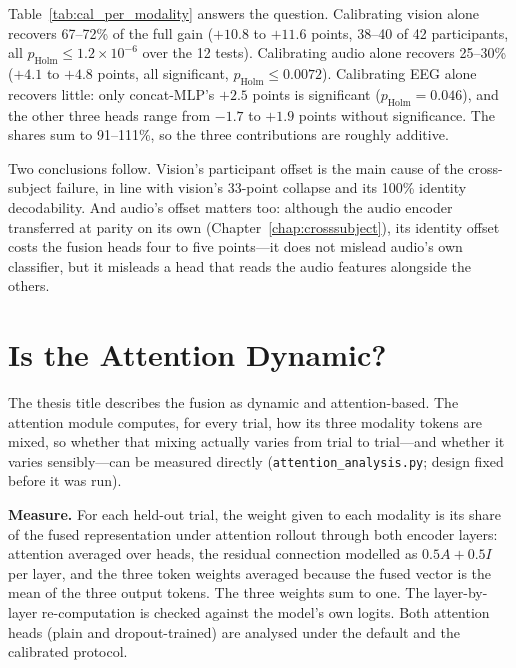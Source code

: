 Table~\ref{tab:cal_per_modality} answers the question. Calibrating vision alone
recovers 67--72\% of the full gain ($+10.8$ to $+11.6$ points, 38--40 of 42
participants, all $p_{\mathrm{Holm}} \le 1.2\times10^{-6}$ over the 12 tests).
Calibrating audio alone recovers 25--30\% ($+4.1$ to $+4.8$ points, all significant,
$p_{\mathrm{Holm}} \le 0.0072$). Calibrating EEG alone recovers little: only
concat-MLP's $+2.5$ points is significant ($p_{\mathrm{Holm}} = 0.046$), and the other
three heads range from $-1.7$ to $+1.9$ points without significance. The shares sum to
91--111\%, so the three contributions are roughly additive.

Two conclusions follow. Vision's participant offset is the main cause of the
cross-subject failure, in line with vision's 33-point collapse and its 100\% identity
decodability. And audio's offset matters too: although the audio encoder transferred at
parity on its own (Chapter~\ref{chap:crosssubject}), its identity offset costs the
fusion heads four to five points---it does not mislead audio's own classifier, but it
misleads a head that reads the audio features alongside the others.

\section{Is the Attention Dynamic?}
\label{sec:cal_attention}

The thesis title describes the fusion as dynamic and attention-based. The attention
module computes, for every trial, how its three modality tokens are mixed, so whether
that mixing actually varies from trial to trial---and whether it varies sensibly---can
be measured directly (\texttt{attention\_analysis.py}; design fixed before it was run).

\textbf{Measure.} For each held-out trial, the weight given to each modality is its
share of the fused representation under attention rollout \cite{Abnar2020Rollout}
through both encoder layers: attention averaged over heads, the residual connection
modelled as $0.5A + 0.5I$ per layer, and the three token weights averaged because the
fused vector is the mean of the three output tokens. The three weights sum to one. The
layer-by-layer re-computation is checked against the model's own logits. Both attention
heads (plain and dropout-trained) are analysed under the default and the calibrated
protocol.

